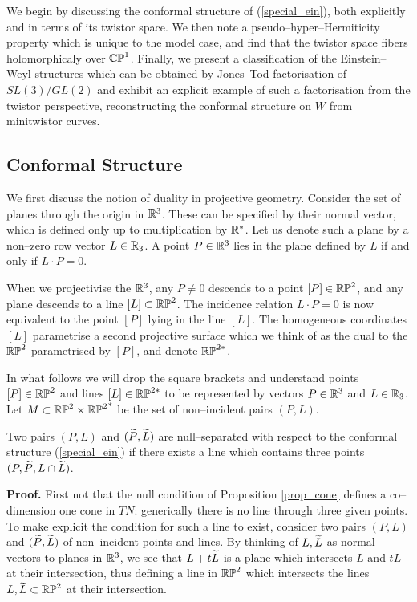We begin by discussing the  conformal structure
of (\ref{special_ein}), both explicitly and in terms of its twistor space. We then note a pseudo--hyper--Hermiticity property which is unique to the model case, and find that the twistor space fibers holomorphicaly over $\mathbb{CP}^1$. Finally, we present a classification of the Einstein--Weyl structures which can be obtained by Jones--Tod factorisation of $SL(3)/GL(2)$ and exhibit an explicit example of such a factorisation from the twistor perspective, reconstructing the conformal structure on $W$ from minitwistor curves.
\subsection{Conformal Structure}
\label{model_conf}
We first discuss the notion of duality in projective geometry. Consider the set of planes through the origin in $\mathbb{R}^3$. These can be specified by their normal vector, which is defined only up to multiplication by $\mathbb{R}^*$. Let us denote such a plane by a non--zero row vector $L\in\mathbb{R}_3$. A point $P\in\mathbb{R}^3$ lies in the plane defined by $L$ if and only if $L\cdot P=0$.

When we projectivise the $\mathbb{R}^3$, any $P\neq 0$ descends to a point $[P]\in\mathbb{RP}^2$, and any plane descends to a line $[L]\subset\mathbb{RP}^2$. The incidence relation $L\cdot P=0$ is now equivalent to the point $[P]$ lying in the line $[L]$. The homogeneous coordinates $[L]$ parametrise a second projective surface which we think of as the dual to the $\mathbb{RP}^2$ parametrised by $[P]$, and denote $\mathbb{RP}^{2*}$.

In what follows we will drop the square brackets and understand points $[P]\in\mathbb{RP}^2$ and lines $[L]\in\mathbb{RP}^{2*}$ to be represented by vectors $P\in\mathbb{R}^3$ and $L\in\mathbb{R}_3$. Let $M\subset \mathbb{RP}^2\times {\mathbb{RP}^2}^*$ be the set of non--incident pairs 
$(P, L)$.
\begin{prop}
\label{prop_cone}
Two pairs $(P, L)$ and $(\widetilde{P}, \widetilde{L})$ are null--separated
with respect to the conformal structure (\ref{special_ein})
if there exists
a line which contains three points $(P, \widetilde{P}, L\cap \widetilde{L})$. 
\end{prop}
{\bf Proof.}
First not that the  null condition of Proposition \ref{prop_cone}
defines a co--dimension one cone in $TN$: 
generically there is no line through three given points. To make explicit the condition for such a line to exist, consider two pairs  $(P, L)$ and $(\widetilde{P}, \widetilde{L})$ 
of non--incident points and lines. By thinking of $L,\widetilde{L}$ as normal vectors to planes in $\mathbb{R}^3$, we see that $L+t\widetilde{L}$ is a plane which intersects $L$ and $tL$ at their intersection, thus defining a line in $\mathbb{RP}^2$ which intersects the lines $L,\widetilde{L}\subset\mathbb{RP}^2$ at their intersection.


